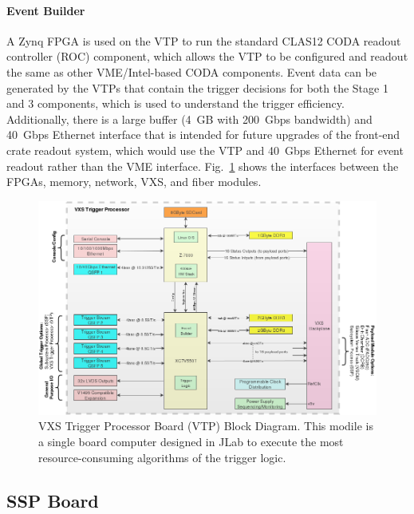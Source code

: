 \paragraph{Event Builder}
A Zynq FPGA is used on the VTP to run the standard CLAS12 CODA readout controller (ROC) component, which allows the VTP to be configured and readout the same as other VME/Intel-based CODA components. Event data can be generated by the VTPs that contain the trigger decisions for both the Stage 1 and 3 components, which is used to understand the trigger efficiency. Additionally, there is a large buffer (4~GB with 200~Gbps bandwidth) and 40~Gbps Ethernet interface that is intended for future upgrades of the front-end crate readout system, which would use the VTP and 40~Gbps Ethernet for event readout rather than the VME interface. Fig.~\ref{fig:vtp_block_daq} shows the interfaces between the FPGAs, memory, network, VXS, and fiber modules.

\begin{figure}[hbt]
	\centering
	\includegraphics[width=1.0\columnwidth,keepaspectratio]{img/vtp_block_daq.png}
	\caption{VXS Trigger Processor Board (VTP) Block Diagram. This modile is a single board computer designed in JLab to execute the most resource-consuming algorithms of the trigger logic.}
	\label{fig:vtp_block_daq}
\end{figure}


\subsection{SSP Board}
\label{sec:ssp_board}

